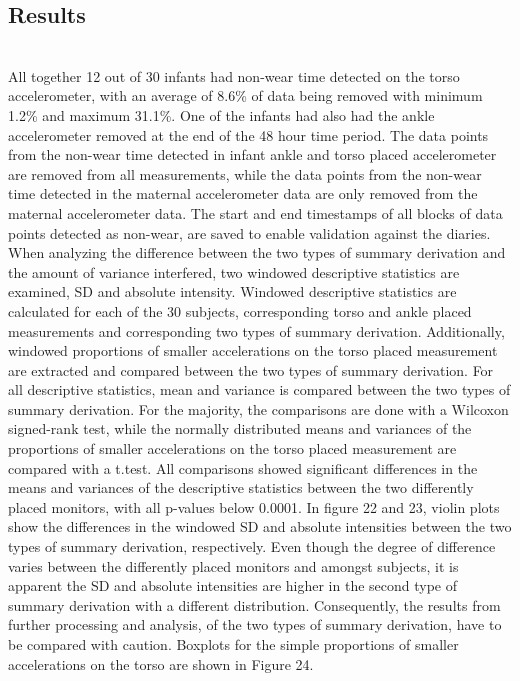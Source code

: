 \documentclass{article}
\begin{document}
{\subsection{Results}
\\
All together 12 out of 30 infants had non-wear time detected on the torso accelerometer, with an average of 8.6\% of data being removed with minimum 1.2\% and maximum 31.1\%. One of the infants had also had the ankle accelerometer removed at the end of the 48 hour time period. The data points from the non-wear time detected in infant ankle and torso placed accelerometer are removed from all measurements, while the data points from the non-wear time detected in the maternal accelerometer data are only removed from the maternal accelerometer data. The start and end timestamps of all blocks of data points detected as non-wear, are saved to enable validation against the diaries.\\
When analyzing the difference between the two types of summary derivation and the amount of variance interfered, two windowed descriptive statistics are examined, SD and absolute intensity. Windowed descriptive statistics are calculated for each of the 30 subjects, corresponding torso and ankle placed measurements and corresponding two types of summary derivation. Additionally, windowed proportions of smaller accelerations on the torso placed measurement are extracted and compared between the two types of summary derivation. For all descriptive statistics, mean and variance is compared between the two types of summary derivation. For the majority, the comparisons are done with a Wilcoxon signed-rank test, while the normally distributed means and variances of the proportions of smaller accelerations on the torso placed measurement are compared with a t.test. All comparisons showed significant differences in the means and variances of the descriptive statistics between the two differently placed monitors, with all p-values below 0.0001. In figure 22 and 23, violin plots show the differences in the windowed SD and absolute intensities between the two types of summary derivation, respectively. Even though the degree of difference varies between the differently placed monitors and amongst subjects, it is apparent the SD and absolute intensities are higher in the second type of summary derivation with a different distribution. Consequently, the results from further processing and analysis, of the two types of summary derivation, have to be compared with caution. Boxplots for the simple proportions of smaller accelerations on the torso are shown in Figure 24.

}
\end{document}
